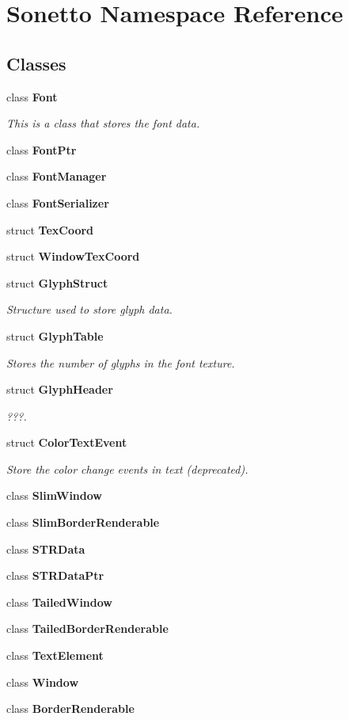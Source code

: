 \section{Sonetto Namespace Reference}
\label{namespace_sonetto}


\subsection*{Classes}
\begin{CompactItemize}
\item 
class {\bf Font}
\begin{CompactList}\small\item\em This is a class that stores the font data. \item\end{CompactList}\item 
class {\bf FontPtr}
\item 
class {\bf FontManager}
\item 
class {\bf FontSerializer}
\item 
struct {\bf TexCoord}
\item 
struct {\bf WindowTexCoord}
\item 
struct {\bf GlyphStruct}
\begin{CompactList}\small\item\em Structure used to store glyph data. \item\end{CompactList}\item 
struct {\bf GlyphTable}
\begin{CompactList}\small\item\em Stores the number of glyphs in the font texture. \item\end{CompactList}\item 
struct {\bf GlyphHeader}
\begin{CompactList}\small\item\em ???. \item\end{CompactList}\item 
struct {\bf ColorTextEvent}
\begin{CompactList}\small\item\em Store the color change events in text (deprecated). \item\end{CompactList}\item 
class {\bf SlimWindow}
\item 
class {\bf SlimBorderRenderable}
\item 
class {\bf STRData}
\item 
class {\bf STRDataPtr}
\item 
class {\bf TailedWindow}
\item 
class {\bf TailedBorderRenderable}
\item 
class {\bf TextElement}
\item 
class {\bf Window}
\item 
class {\bf BorderRenderable}
\end{CompactItemize}
